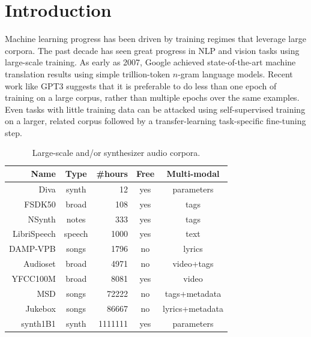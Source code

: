 \section{Introduction}
\label{sec:intro}

Machine learning progress has been driven by training regimes that leverage large corpora. The past decade has seen great progress in NLP and vision tasks using large-scale training. As early as 2007, Google \cite{brants-etal-2007-large} achieved state-of-the-art machine translation results using simple trillion-token $n$-gram language models.
Recent work like GPT3 \cite{NEURIPS2020_1457c0d6} suggests that it is preferable to do less than one epoch of training on a large corpus, rather than multiple epochs over the same examples. Even tasks with little training data can be attacked using self-supervised training on a larger, related corpus followed by a transfer-learning task-specific fine-tuning step.

\begin{table}[thb]
\begin{center}
\begin{tabular}{r|c|r|c|c}
Name & Type & \#hours & Free & Multi-modal \\
\hline
Diva \cite{esling2020flow} & synth & 12 & yes & parameters \\
FSDK50 \cite{fonseca2020fsd50k} & broad & 108 & yes & tags \\
NSynth \cite{engel2017neural} & notes & 333 & yes & tags \\
LibriSpeech \cite{librispeech} & speech & 1000 & yes & text \\ 
DAMP-VPB \cite{smule_inc_2017_2616690} & songs & 1796 & no & lyrics \\
Audioset \cite{45857} & broad & 4971 & no & video+tags \\ 
YFCC100M \cite{thomee2016yfcc100m} & broad & 8081 & yes & video \\
MSD \cite{bertin2011million} & songs & 72222 & no & tags+metadata \\
Jukebox \cite{dhariwal2020jukebox} & songs & 86667 & no & {\footnotesize lyrics+metadata}\\
synth1B1 & synth & 1111111 & yes & parameters \\
\end{tabular}
\end{center}
\caption{Large-scale and/or synthesizer audio corpora.}
\label{tbl:audio-corpora}
\end{table}


